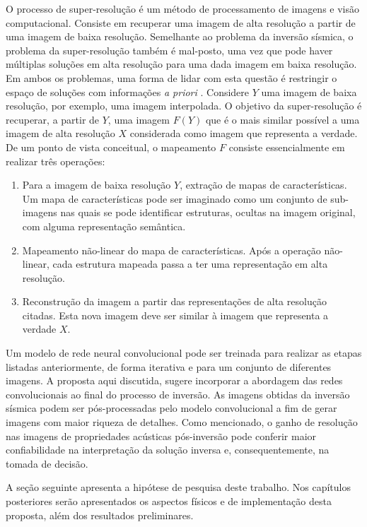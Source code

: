 O processo de super-resolução é um método de processamento de imagens e visão computacional.
Consiste em recuperar uma imagem de alta resolução a partir de uma imagem
de baixa resolução. Semelhante ao problema da inversão sísmica, o problema da super-resolução
também é mal-posto, uma vez que pode haver múltiplas soluções em alta resolução para uma dada imagem em baixa
resolução. Em ambos os problemas, uma forma de lidar com esta questão é restringir o espaço
de soluções com informações \textit{a priori} \citep{DongLoy14}. 
Considere $Y$ uma imagem de baixa resolução, por exemplo, uma
imagem interpolada. O objetivo da super-resolução é
recuperar, a partir de $Y$, uma imagem $F(Y)$ que é
o mais similar possível a uma imagem de alta resolução $X$
considerada como imagem que representa a verdade.
De um ponto de vista conceitual, o mapeamento $F$ consiste essencialmente em
realizar três operações:
\begin{enumerate}
 \item Para a imagem de baixa resolução $Y$, extração de mapas de características. Um mapa de características
 pode ser imaginado como um conjunto de sub-imagens nas quais se pode identificar estruturas, ocultas na imagem original, com
 alguma representação semântica.
 \item Mapeamento não-linear do mapa de características. Após a operação não-linear, cada estrutura mapeada
 passa a ter uma representação em alta resolução.
 \item Reconstrução da imagem a partir das representações de alta resolução citadas. Esta nova imagem
 deve ser similar à imagem que representa a verdade $X$.
\end{enumerate}

Um modelo de rede neural convolucional pode ser treinada para realizar as etapas listadas anteriormente,
de forma iterativa e para um conjunto de diferentes imagens.
A proposta aqui discutida, sugere incorporar a abordagem das redes convolucionais ao final do processo de inversão.
As imagens obtidas da inversão sísmica podem ser pós-processadas pelo modelo convolucional
a fim de gerar imagens com maior riqueza de detalhes. Como mencionado, o ganho de resolução
nas imagens de propriedades acústicas pós-inversão pode conferir maior confiabilidade
na interpretação da solução inversa e, consequentemente, na tomada de decisão.

A seção seguinte apresenta a hipótese de pesquisa deste trabalho. Nos capítulos posteriores
serão apresentados os aspectos físicos e de implementação desta proposta, além dos resultados preliminares.

